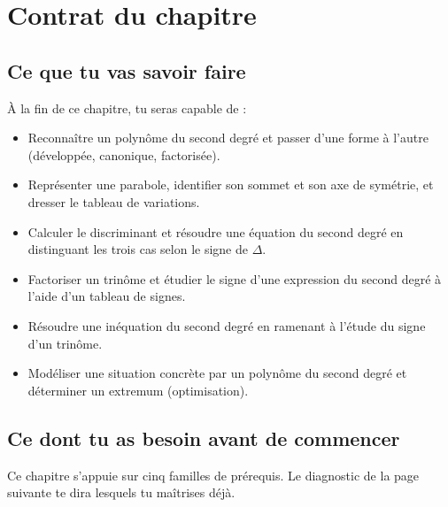 \section*{Contrat du chapitre}

\subsection*{Ce que tu vas savoir faire}

À la fin de ce chapitre, tu seras capable de :

\begin{itemize}
  \item[\textbf{C1}] Reconnaître un polynôme du second degré et passer d'une forme à l'autre (développée, canonique, factorisée).
  \item[\textbf{C2}] Représenter une parabole, identifier son sommet et son axe de symétrie, et dresser le tableau de variations.
  \item[\textbf{C3}] Calculer le discriminant et résoudre une équation du second degré en distinguant les trois cas selon le signe de $\Delta$.
  \item[\textbf{C4}] Factoriser un trinôme et étudier le signe d'une expression du second degré à l'aide d'un tableau de signes.
  \item[\textbf{C5}] Résoudre une inéquation du second degré en ramenant à l'étude du signe d'un trinôme.
  \item[\textbf{C6}] Modéliser une situation concrète par un polynôme du second degré et déterminer un extremum (optimisation).
\end{itemize}

\subsection*{Ce dont tu as besoin avant de commencer}

Ce chapitre s'appuie sur cinq familles de prérequis. Le diagnostic de la page suivante te dira lesquels tu maîtrises déjà.

